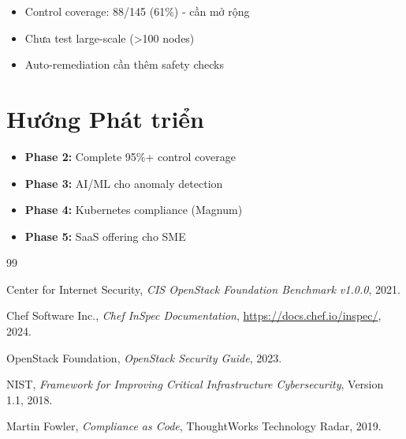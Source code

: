 \documentclass[12pt,a4paper]{report}
\begin{document}
\begin{itemize}
    \item Control coverage: 88/145 (61\%) - cần mở rộng
    \item Chưa test large-scale (>100 nodes)
    \item Auto-remediation cần thêm safety checks
\end{itemize}

\section{Hướng Phát triển}

\begin{itemize}
    \item \textbf{Phase 2:} Complete 95\%+ control coverage
    \item \textbf{Phase 3:} AI/ML cho anomaly detection
    \item \textbf{Phase 4:} Kubernetes compliance (Magnum)
    \item \textbf{Phase 5:} SaaS offering cho SME
\end{itemize}

\begin{thebibliography}{99}

Center for Internet Security,
\textit{CIS OpenStack Foundation Benchmark v1.0.0},
2021.

Chef Software Inc.,
\textit{Chef InSpec Documentation},
\url{https://docs.chef.io/inspec/},
2024.

OpenStack Foundation,
\textit{OpenStack Security Guide},
2023.

NIST,
\textit{Framework for Improving Critical Infrastructure Cybersecurity},
Version 1.1, 2018.

Martin Fowler,
\textit{Compliance as Code},
ThoughtWorks Technology Radar,
2019.

\end{thebibliography}
\end{document}
